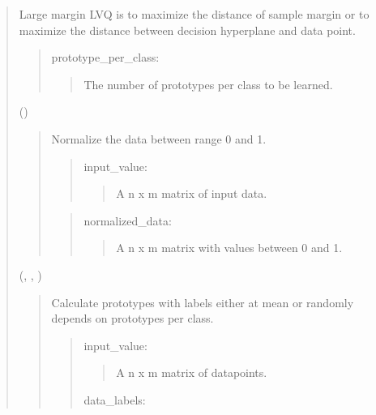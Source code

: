 \documentclass[letterpaper,10pt,english,openany,oneside]{sphinxmanual}
\begin{document}
\begin{quote}

Large margin LVQ is to maximize the distance of sample margin or to maximize the distance between decision hyperplane and data point.

\begin{quote}

prototype\_per\_class:
\begin{quote}

The number of prototypes per class to be learned.
\end{quote}
\end{quote}

()
\begin{quote}

Normalize the data between range 0 and 1.

\begin{quote}

input\_value:
\begin{quote}

A n x m matrix of input data.
\end{quote}
\end{quote}

\begin{quote}

normalized\_data:
\begin{quote}

A n x m matrix with values between 0 and 1.
\end{quote}
\end{quote}
\end{quote}

(, , )
\begin{quote}

Calculate prototypes with labels either at mean or randomly depends on prototypes per class.

\begin{quote}

input\_value:
\begin{quote}

A n x m matrix of datapoints.
\end{quote}

data\_labels:
\begin{quote}


\end{quote}
\end{quote}
\end{quote}
\end{quote}
\end{document}
